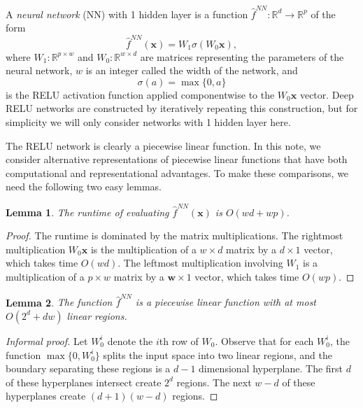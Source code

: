 \documentclass{article}
\newtheorem{lemma}{Lemma}
\newcommand{\defn}[1]{\textit{#1}}
\newcommand{\R}{\mathbb{R}}
\newcommand{\w}{\mathbf w}
\newcommand{\wnn}{W}
\newcommand{\x}{\mathbf{x}}
\newcommand{\f}{f}
\newcommand{\fhat}{{\hat\f}}
\newcommand{\fnn}{{\fhat^\textit{NN}}}
\begin{document}
A \defn{neural network} (NN) with 1 hidden layer is a function $\fnn : \R^d \to \R^p$ of the form
\begin{equation}
    \fnn(\x) = \wnn_1\sigma(\wnn_0\x), 
    \label{eq:nn}
\end{equation}
where $\wnn_1 : \R^{p\times w}$ and $\wnn_0 : \R^{w\times d}$ are matrices representing the parameters of the neural network,
$w$ is an integer called the width of the network,
and
\begin{equation}
    \sigma(a) = \max\{0,a\}
\end{equation}
is the RELU activation function applied componentwise to the $\wnn_0\x$ vector.
Deep RELU networks are constructed by iteratively repeating this construction,
but for simplicity we will only consider networks with 1 hidden layer here.

The RELU network is clearly a piecewise linear function.
In this note, we consider alternative representations of piecewise linear functions that have both computational and representational advantages.
To make these comparisons, we need the following two easy lemmas.


\begin{lemma}
The runtime of evaluating $\fnn(\x)$ is $O(wd+wp)$.
\label{lem:nn:time}
\end{lemma}
\begin{proof}
The runtime is dominated by the matrix multiplications.
The rightmost multiplication $\wnn_0\x$ is the multiplication of a $w\times d$ matrix by a $d\times1$ vector, which takes time $O(wd)$.
The leftmost multiplication involving $\wnn_1$ is a multiplication of a $p\times w$ matrix by a $\w\times1$ vector, which takes time $O(wp)$.
\end{proof}


\begin{lemma}
The function $\fnn$ is a piecewise linear function with at most $O(2^d+dw)$ linear regions.
\label{lem:nn:pieces}
\end{lemma}
\begin{proof}[Informal proof]
Let $\wnn_0^i$ denote the $i$th row of $\wnn_0$.
Observe that for each $\wnn_0^i$, 
the function $\max\{0,\wnn_0^i\}$ splits the input space into two linear regions,
and the boundary separating these regions is a $d-1$ dimensional hyperplane.
The first $d$ of these hyperplanes intersect create $2^d$ regions.
The next $w-d$ of these hyperplanes create $(d+1)(w-d)$ regions.
\end{proof}
\end{document}
